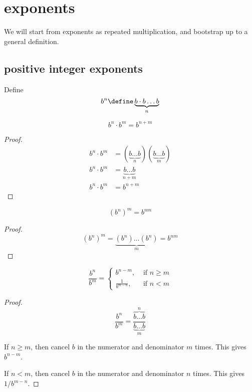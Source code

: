 \documentclass[10pt]{scrartcl}
\begin{document}
\section{exponents}
We will start from exponents as repeated multiplication, and bootstrap up to a general definition. 
\subsection{positive integer exponents}
\begin{defn}
  Define 
  \[
  b^n\define \underbrace{b\cdot b \dots b}_n
  \]
\end{defn}

\begin{theorem}
  \label{th:exp-mult}
  \begin{equation}
    \label{eq:exp-mult}
    b^n \cdot b^m = b^{n+m}
  \end{equation}
\end{theorem}
\begin{proof}
  \begin{align*}
    b^n\cdot b^m &= (\underbrace{b\dots b}_n) (\underbrace{b\dots b}_m) \\
    b^n\cdot b^m &= \underbrace{b\dots b}_{n+m} \\
    b^n\cdot b^m &= b^{n+m}
  \end{align*}
\end{proof}
\begin{cor}
  \label{th:exp-exp}
  \begin{equation}
    \label{eq:exp-exp}
    \left(b^n\right)^m = b^{nm}
  \end{equation}
\end{cor}
\begin{proof}
  \[
  (b^n)^m = \underbrace{(b^n)\dots (b^n)}_m = b^{nm}
  \]
\end{proof}

\begin{cor}
  \label{th:exp-div0}
  \begin{equation}
    \label{eq:exp-div0}
    \frac{b^n}{b^m}=
    \begin{cases}
      b^{n-m},&\textrm{ if } n\geq m \\
      \frac{1}{b^{m-n}},&\textrm{ if } n < m
    \end{cases}
  \end{equation}
\end{cor}
\begin{proof}
  \[
  \frac{b^n}{b^m}=\frac{\overbrace{b\dots b}^n}{\underbrace{b\dots b}_m}
  \]

  If $n\geq m$, then cancel $b$ in the numerator and denominator $m$ times. This gives $b^{n-m}$. 
  
If $n<m$, then cancel $b$ in the numerator and denominator $n$ times. This gives $1/b^{m-n}$. 
\end{proof}
\end{document}
